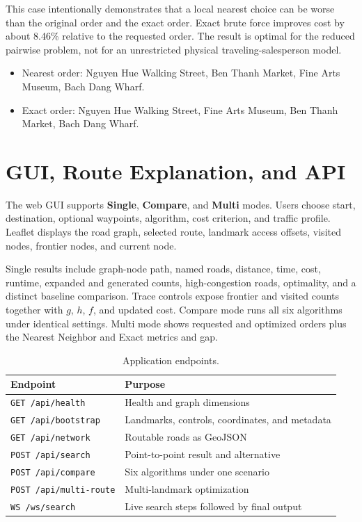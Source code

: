 \documentclass[12pt,a4paper]{article}
\begin{document}
This case intentionally demonstrates that a local nearest choice can be worse
than the original order and the exact order. Exact brute force improves cost by
about 8.46\% relative to the requested order. The result is optimal for the
reduced pairwise problem, not for an unrestricted physical traveling-salesperson
model.

\begin{itemize}
    \item Nearest order: Nguyen Hue Walking Street, Ben Thanh Market, Fine Arts
          Museum, Bach Dang Wharf.
    \item Exact order: Nguyen Hue Walking Street, Fine Arts Museum, Ben Thanh
          Market, Bach Dang Wharf.
\end{itemize}

\section{GUI, Route Explanation, and API}

The web GUI supports \textbf{Single}, \textbf{Compare}, and \textbf{Multi}
modes. Users choose start, destination, optional waypoints, algorithm, cost
criterion, and traffic profile. Leaflet displays the road graph, selected
route, landmark access offsets, visited nodes, frontier nodes, and current node.

Single results include graph-node path, named roads, distance, time, cost,
runtime, expanded and generated counts, high-congestion roads, optimality, and
a distinct baseline comparison. Trace controls expose frontier and visited
counts together with $g$, $h$, $f$, and updated cost. Compare mode runs all six
algorithms under identical settings. Multi mode shows requested and optimized
orders plus the Nearest Neighbor and Exact metrics and gap.

\begin{table}[H]
    \centering
    \caption{Application endpoints.}
    \label{tab:api}
    \renewcommand{\arraystretch}{1.12}
    \small
    \begin{tabularx}{\textwidth}{P{4.2cm} Y}
        \toprule
        \textbf{Endpoint} & \textbf{Purpose} \\
        \midrule
        \texttt{GET /api/health} & Health and graph dimensions \\
        \texttt{GET /api/bootstrap} & Landmarks, controls, coordinates, and metadata \\
        \texttt{GET /api/network} & Routable roads as GeoJSON \\
        \texttt{POST /api/search} & Point-to-point result and alternative \\
        \texttt{POST /api/compare} & Six algorithms under one scenario \\
        \texttt{POST /api/multi-route} & Multi-landmark optimization \\
        \texttt{WS /ws/search} & Live search steps followed by final output \\
        \bottomrule
    \end{tabularx}
\end{table}
\end{document}
